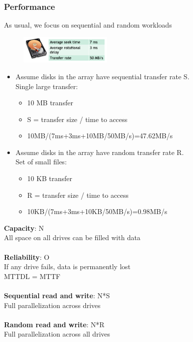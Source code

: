 \documentclass[10pt, oneside]{article}
\begin{document}
\subsubsection*{Performance}
As usual, we focus on sequential and random workloads
\begin{figure}[H]
    \begin{center}
    \includegraphics[width=0.4\textwidth]{img/img65.png}
    \end{center}
\end{figure}
\begin{itemize}
    \item Assume disks in the array have sequential transfer rate S.\\Single large transfer:\begin{itemize}
        \item 10 MB transfer
        \item S = transfer size / time to access
        \item 10MB/(7ms+3ms+10MB/50MB/s)=47.62MB/s
    \end{itemize}
    \item Assume disks in the array have random transfer rate R.\\Set of small files:\begin{itemize}
        \item 10 KB transfer
        \item R = transfer size / time to access
        \item 10KB/(7ms+3ms+10KB/50MB/s)=0.98MB/s
    \end{itemize}
\end{itemize}
{\bf Capacity}: N\\  All space on all drives can be filled with data\\\\
{\bf Reliability}: O\\  If any drive fails, data is permanently lost\\  MTTDL = MTTF\\\\
{\bf Sequential read and write}: N*S\\  Full parallelization across drives\\\\
{\bf Random read and write}: N*R\\ Full parallelization across all drives
\end{document}
